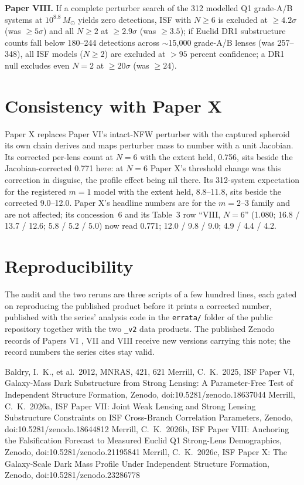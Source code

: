 \documentclass[twocolumn,11pt]{article}
\newcommand{\Msun}{M_\odot}
\begin{document}
\textbf{Paper VIII.} If a complete perturber search of the 312
modelled Q1 grade-A/B systems at $10^{8.8}\,\Msun$ yields zero
detections, ISF with $N\geq6$ is excluded at $\geq4.2\sigma$ (was
$\geq5\sigma$) and all $N\geq2$ at $\geq2.9\sigma$ (was $\geq3.5$); if
Euclid DR1 substructure counts fall below 180--244 detections across
$\sim$15,000 grade-A/B lenses (was 257--348), all ISF models ($N\geq2$)
are excluded at $>95$ percent confidence; a DR1 null excludes even
$N=2$ at $\geq20\sigma$ (was $\geq24$).

\section{Consistency with Paper X}
\label{sec:paperx}

Paper X replaces Paper VI's intact-NFW perturber with the captured
spheroid its own chain derives and maps perturber mass to number with
a unit Jacobian. Its corrected per-lens count at $N=6$ with the extent
held, 0.756, sits beside the Jacobian-corrected 0.771 here: at $N=6$
Paper X's threshold change was this correction in disguise, the profile
effect being nil there. Its 312-system expectation for the registered
$m=1$ model with the extent held, 8.8--11.8, sits beside the corrected
9.0--12.0. Paper X's headline numbers are for the $m=2$--3 family and
are not affected; its concession~6 and its Table~3 row ``VIII, $N=6$''
(1.080; 16.8 / 13.7 / 12.6; 5.8 / 5.2 / 5.0) now read 0.771; 12.0 / 9.8 /
9.0; 4.9 / 4.4 / 4.2.

\section{Reproducibility}

The audit and the two reruns are three scripts of a few hundred lines,
each gated on reproducing the published product before it prints a
corrected number, published with the series' analysis code in the
\texttt{errata/} folder of the public repository together with the two
\texttt{\_v2} data products. The published Zenodo records of Papers VI
\citep{paper6}, VII \citep{paper7} and VIII \citep{paper8} receive new
versions carrying this note; the record numbers the series cites stay
valid.

\begin{thebibliography}{}
 Baldry, I.~K., et al.\ 2012,
MNRAS, 421, 621
 Merrill, C.~K.\ 2025, ISF Paper VI,
Galaxy-Mass Dark Substructure from Strong Lensing: A Parameter-Free Test of Independent Structure Formation, Zenodo,
doi:10.5281/zenodo.18637044
 Merrill, C.~K.\ 2026a, ISF Paper VII:
Joint Weak Lensing and Strong Lensing Substructure Constraints on ISF Cross-Branch Correlation Parameters, Zenodo,
doi:10.5281/zenodo.18644812
 Merrill, C.~K.\ 2026b, ISF Paper VIII:
Anchoring the Falsification Forecast to Measured Euclid Q1 Strong-Lens
Demographics, Zenodo, doi:10.5281/zenodo.21195841
 Merrill, C.~K.\ 2026c, ISF Paper X:
The Galaxy-Scale Dark Mass Profile Under Independent Structure
Formation, Zenodo, doi:10.5281/zenodo.23286778
\end{thebibliography}
\end{document}
